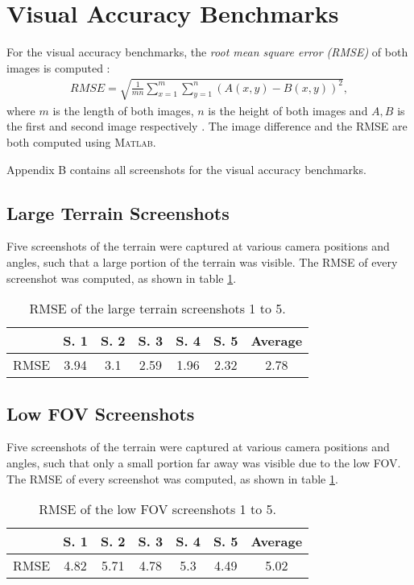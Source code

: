 \section{Visual Accuracy Benchmarks}
For the visual accuracy benchmarks, the \textit{root mean square error (RMSE)} of 
both images is computed :
\begin{align*}
  RMSE = \sqrt{\frac{1}{mn} \sum_{x=1}^m \sum_{y=1}^n (A(x,y) - B(x,y))^2},
\end{align*}
where $m$ is the length of both images, $n$ is the height of both images and $A,B$ is the first and second image respectively \cite[p.~47]{cpvripai}.
The image difference and the RMSE are both computed using \textsc{Matlab}.

Appendix B contains all screenshots for the visual accuracy benchmarks.

\subsection{Large Terrain Screenshots}
Five screenshots of the terrain were captured at various camera positions and angles,
such that a large portion of the terrain was visible.
The RMSE of every screenshot was computed, as shown in table \ref{tbl:results-rmse-large}.

\begin{table}[H]
  \begin{center}
    \begin{tabular}{ c|c|c|c|c|c|c }
      & S. 1 & S. 2 & S. 3 & S. 4 & S. 5 & Average\\
      \hline
      RMSE & 3.94 & 3.1 & 2.59 & 1.96 & 2.32 & 2.78
    \end{tabular}
  \end{center}
  \caption{RMSE of the large terrain screenshots 1 to 5.}\label{tbl:results-rmse-large}
\end{table}

\subsection{Low FOV Screenshots}
Five screenshots of the terrain were captured at various camera positions and angles,
such that only a small portion far away was visible due to the low FOV.
The RMSE of every screenshot was computed, as shown in table \ref{tbl:results-rmse-large}.
\begin{table}[H]
  \begin{center}
    \begin{tabular}{ c|c|c|c|c|c|c }
      & S. 1 & S. 2 & S. 3 & S. 4 & S. 5 & Average\\
      \hline
      RMSE & 4.82 & 5.71 & 4.78 & 5.3 & 4.49 & 5.02
    \end{tabular}
  \end{center}
  \caption{RMSE of the low FOV screenshots 1 to 5.}\label{tbl:results-rmse-low-fov}
\end{table}

